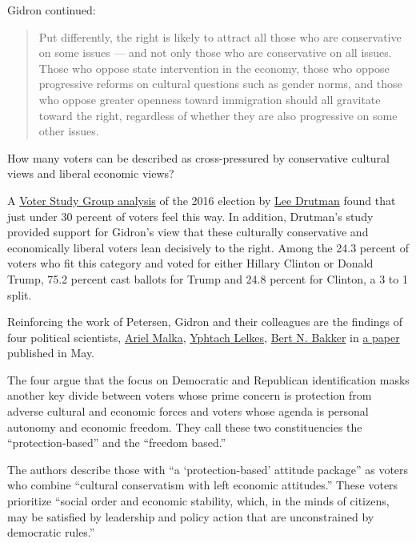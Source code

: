 Gidron continued:

\begin{quote}
Put differently, the right is likely to attract all those who are
conservative on some issues --- and not only those who are conservative
on all issues. Those who oppose state intervention in the economy, those
who oppose progressive reforms on cultural questions such as gender
norms, and those who oppose greater openness toward immigration should
all gravitate toward the right, regardless of whether they are also
progressive on some other issues.
\end{quote}

How many voters can be described as cross-pressured by conservative
cultural views and liberal economic views?

A
\href{https://www.voterstudygroup.org/publication/political-divisions-in-2016-and-beyond}{Voter
Study Group analysis} of the 2016 election by
\href{https://www.newamerica.org/our-people/lee-drutman/}{Lee Drutman}
found that just under 30 percent of voters feel this way. In addition,
Drutman's study provided support for Gidron's view that these culturally
conservative and economically liberal voters lean decisively to the
right. Among the 24.3 percent of voters who fit this category and voted
for either Hillary Clinton or Donald Trump, 75.2 percent cast ballots
for Trump and 24.8 percent for Clinton, a 3 to 1 split.

Reinforcing the work of Petersen, Gidron and their colleagues are the
findings of four political scientists,
\href{https://www.yu.edu/faculty/pages/malka-ariel}{Ariel Malka},
\href{https://www.ylelkes.com/}{Yphtach Lelkes},
\href{http://www.bertbakker.com/wp-content/uploads/2012/04/Bakker_CV_Aug2015.pdf}{Bert
N. Bakker} in
\href{https://malkaresearch.files.wordpress.com/2020/06/malka-lelkes-bakker-spivack-inpress-pop-2020-withfigures.pdf}{a
paper} published in May.

The four argue that the focus on Democratic and Republican
identification masks another key divide between voters whose prime
concern is protection from adverse cultural and economic forces and
voters whose agenda is personal autonomy and economic freedom. They call
these two constituencies the ``protection-based'' and the ``freedom
based.''

The authors describe those with ``a `protection-based' attitude
package'' as voters who combine ``cultural conservatism with left
economic attitudes.'' These voters prioritize ``social order and
economic stability, which, in the minds of citizens, may be satisfied by
leadership and policy action that are unconstrained by democratic
rules.''

